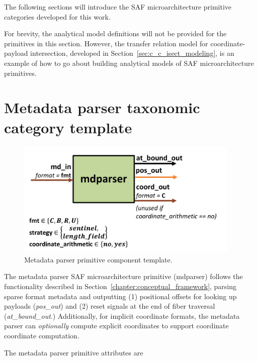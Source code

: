 The following sections will introduce the SAF microarchitecture primitive categories developed for this work. 

For brevity, the analytical model definitions will not be provided for the primitives in this section. However, the transfer relation model for coordinate-payload intersection, developed in Section~\ref{sec:c_c_isect_modeling}, is an example of how to go about building analytical models of SAF microarchitecture primitives.

\section{Metadata parser taxonomic category template}

\begin{figure}[H]
    \centering
    \includegraphics[width=0.95\textwidth]{figures/mdparser.pdf}
    \caption{Metadata parser primitive component template.}
    \label{fig:mdparser}
\end{figure}

The metadata parser SAF microarchitecture primitive (mdparser) follows the functionality described in Section~\ref{chapter:conceptual_framework}, parsing sparse format metadata and outputting (1) positional offsets for looking up payloads (\textit{pos\_out}) and (2) reset signals at the end of fiber traversal (\textit{at\_bound\_out}.) Additionally, for implicit coordinate formats, the metadata parser can \textit{optionally} compute explicit coordinates to support coordinate coordinate computation.

The metadata parser primitive attributes are

